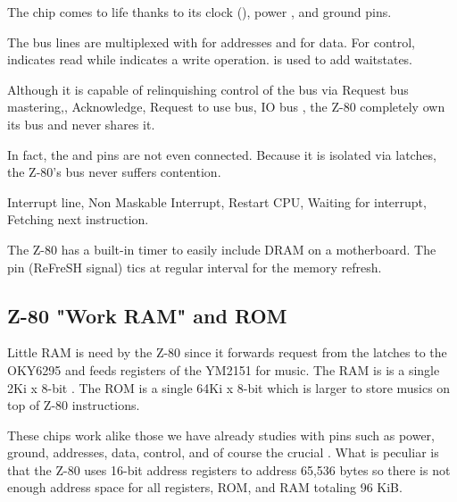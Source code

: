 




The chip comes to life thanks to its clock (), power , and ground  pins.

The bus lines are multiplexed with  for addresses and  for data. For control,  indicates read while  indicates a write operation.  is used to add waitstates. 

Although it is capable of relinquishing control of the bus via  Request bus mastering,, Acknowledge,  Request to use bus, IO bus , the Z-80 completely own its bus and never shares it. 

In fact, the  and  pins are not even connected.  Because it is isolated via latches, the Z-80's bus never suffers contention.


 Interrupt line,  Non Maskable Interrupt,  Restart CPU,  Waiting for interrupt,  Fetching next instruction.

\begin{trivia}
 The Z-80 has a built-in timer to easily include DRAM on a motherboard. The  pin (ReFreSH signal) tics at regular interval for the memory refresh.
\end{trivia}

\subsection{Z-80 "Work RAM" and ROM}
Little RAM is need by the Z-80 since it forwards request from the latches to the OKY6295 and feeds registers  of the YM2151 for music. The RAM is is a single 2Ki x 8-bit . The ROM is a single 64Ki x 8-bit  which is larger to store musics on top of Z-80 instructions. 



These chips work alike those we have already studies with pins such as power, ground, addresses, data, control, and of course the crucial . What is peculiar is that the Z-80 uses 16-bit address registers to address 65,536 bytes so there is not enough address space for all registers, ROM, and RAM totaling 96 KiB.

